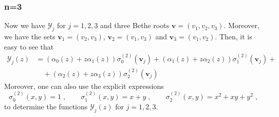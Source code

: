 \documentclass[a4paper,11pt]{amsart}
\begin{document}
\subsubsection{n=3} Now we have \(\mathcal{Y}_j\) for \(j=1,2,3\) and three Bethe roots
\(\bm{v} = (v_1, v_2, v_3)\). Moreover, we have the sets \(\bm{v}_1 = (v_2, v_3)\), \(\bm{v}_2 = (v_1, v_3)\)
and \(\bm{v}_3 = (v_1, v_2)\). Then, it is easy to see that
\begin{equation}
\begin{split}
  \mathcal{Y}_j(z)
  & = (\alpha_0(z) + z \alpha_1(z))\sigma_0^{(2)}(\bm{v}_j)   + (\alpha_1(z) + z \alpha_2(z))\sigma_1^{(2)}(\bm{v}_j)  + \\
  & \quad + (\alpha_2(z) + z \alpha_3(z))\sigma_2^{(2)}(\bm{v}_j) 
\end{split}
\end{equation}
Moreover, one can also use the explicit expressions 
\begin{equation}
  \sigma_0^{(2)}(x, y) = 1\; ,\qquad 
  \sigma_1^{(2)}(x, y) = x + y\; ,\qquad 
  \sigma_2^{(2)}(x, y) = x^2 + xy  + y^2\; , 
\end{equation}
to determine the functions \(\mathcal{Y}_j(z)\) for \(j=1,2,3\).
\end{document}
